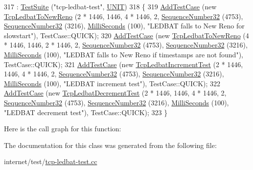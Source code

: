 \begin{DoxyCode}
317                         : \hyperlink{classns3_1_1TestSuite_a904b0c40583b744d30908aeb94636d1a}{TestSuite} (\textcolor{stringliteral}{"tcp-ledbat-test"}, \hyperlink{classns3_1_1TestSuite_a1ebfcab34ec8161e085e8e3a1855eae0a3885375a3787abf60431f8454b3cadbd}{UNIT})
318   \{
319     \hyperlink{classns3_1_1TestCase_a3718088e3eefd5d6454569d2e0ddd835}{AddTestCase} (\textcolor{keyword}{new} \hyperlink{classTcpLedbatToNewReno}{TcpLedbatToNewReno} (2 * 1446, 1446, 4 * 1446, 2, 
      \hyperlink{classns3_1_1SequenceNumber}{SequenceNumber32} (4753), \hyperlink{classns3_1_1SequenceNumber}{SequenceNumber32} (3216), 
      \hyperlink{group__timecivil_gaf26127cf4571146b83a92ee18679c7a9}{MilliSeconds} (100), \textcolor{stringliteral}{"LEDBAT falls to New Reno for slowstart"}), TestCase::QUICK);
320     \hyperlink{classns3_1_1TestCase_a3718088e3eefd5d6454569d2e0ddd835}{AddTestCase} (\textcolor{keyword}{new} \hyperlink{classTcpLedbatToNewReno}{TcpLedbatToNewReno} (4 * 1446, 1446, 2 * 1446, 2, 
      \hyperlink{classns3_1_1SequenceNumber}{SequenceNumber32} (4753), \hyperlink{classns3_1_1SequenceNumber}{SequenceNumber32} (3216), 
      \hyperlink{group__timecivil_gaf26127cf4571146b83a92ee18679c7a9}{MilliSeconds} (100), \textcolor{stringliteral}{"LEDBAT falls to New Reno if timestamps are not found"}), TestCase::QUICK);
321     \hyperlink{classns3_1_1TestCase_a3718088e3eefd5d6454569d2e0ddd835}{AddTestCase} (\textcolor{keyword}{new} \hyperlink{classTcpLedbatIncrementTest}{TcpLedbatIncrementTest} (2 * 1446, 1446, 4 * 1446, 2, 
      \hyperlink{classns3_1_1SequenceNumber}{SequenceNumber32} (4753), \hyperlink{classns3_1_1SequenceNumber}{SequenceNumber32} (3216), 
      \hyperlink{group__timecivil_gaf26127cf4571146b83a92ee18679c7a9}{MilliSeconds} (100), \textcolor{stringliteral}{"LEDBAT increment test"}), TestCase::QUICK);
322     \hyperlink{classns3_1_1TestCase_a3718088e3eefd5d6454569d2e0ddd835}{AddTestCase} (\textcolor{keyword}{new} \hyperlink{classTcpLedbatDecrementTest}{TcpLedbatDecrementTest} (2 * 1446, 1446, 4 * 1446, 2, 
      \hyperlink{classns3_1_1SequenceNumber}{SequenceNumber32} (4753), \hyperlink{classns3_1_1SequenceNumber}{SequenceNumber32} (3216), 
      \hyperlink{group__timecivil_gaf26127cf4571146b83a92ee18679c7a9}{MilliSeconds} (100), \textcolor{stringliteral}{"LEDBAT decrement test"}), TestCase::QUICK);
323   \}
\end{DoxyCode}


Here is the call graph for this function\+:




The documentation for this class was generated from the following file\+:\begin{DoxyCompactItemize}
\item 
internet/test/\hyperlink{tcp-ledbat-test_8cc}{tcp-\/ledbat-\/test.\+cc}\end{DoxyCompactItemize}
